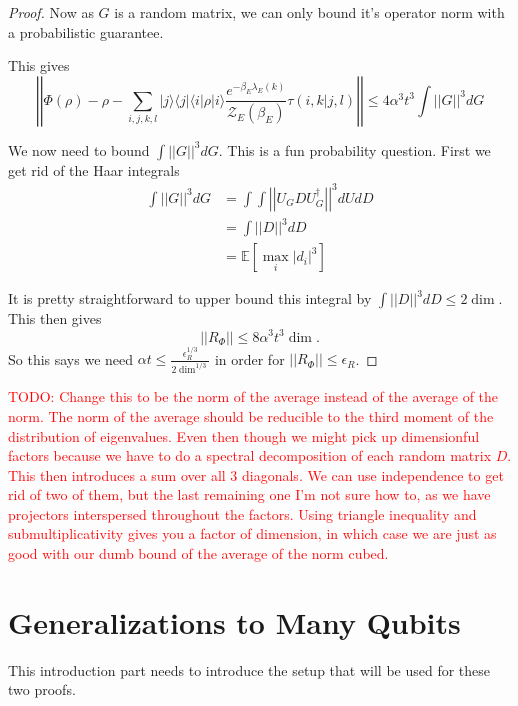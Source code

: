 \documentclass{article}
\newcommand{\ket}[1]{|#1\rangle}
\newcommand{\bra}[1]{\langle #1|}
\newcommand{\ketbra}[2]{| #1\rangle\! \langle #2|}
\newcommand{\brackets}[1]{\left[ #1 \right]}
\newcommand{\norm}[1]{\left| \left| #1 \right| \right|}
\newcommand{\expect}[1]{\mathbb{E}\brackets{#1}}
\newcommand{\partfun}{\mathcal{Z}}
\begin{document}
\begin{proof}
Now as $G$ is a random matrix, we can only bound it's operator norm with a probabilistic guarantee. 

This gives
\begin{equation}
    \norm{\Phi(\rho) - \rho - \sum_{i,j,k,l} \ketbra{j}{j} \bra{i} \rho \ket{i} \frac{e^{-\beta_E \lambda_E(k)}}{\partfun_E(\beta_E)} \tau(i,k | j, l) } \leq 4 \alpha^3 t^3 \int \norm{G}^3 dG
\end{equation}

We now need to bound $\int \norm{G}^3 dG$. This is a fun probability question. First we get rid of the Haar integrals
\begin{align}
    \int \norm{G}^3 dG &= \int \int \norm{U_G D U_G^\dagger}^3  dU dD \\
    &= \int \norm{D}^3 dD \\
    &= \expect{\max_i |d_i|^3}
\end{align}

It is pretty straightforward to upper bound this integral by $\int \norm{D}^3 dD \leq 2 \dim$. This then gives
\begin{equation}
    \norm{R_{\Phi}} \leq 8 \alpha^3 t^3 \dim.
\end{equation}
So this says we need $\alpha t \leq \frac{\epsilon_{R}^{1/3}}{2 \dim^{1/3}}$ in order for $\norm{R_{\Phi}} \leq \epsilon_R$.
\end{proof}

\textcolor{red}{TODO: Change this to be the norm of the average instead of the average of the norm. The norm of the average should be reducible to the third moment of the distribution of eigenvalues. Even then though we might pick up dimensionful factors because we have to do a spectral decomposition of each random matrix $D$. This then introduces a sum over all 3 diagonals. We can use independence to get rid of two of them, but the last remaining one I'm not sure how to, as we have projectors interspersed throughout the factors. Using triangle inequality and submultiplicativity gives you a factor of dimension, in which case we are just as good with our dumb bound of the average of the norm cubed.}

\section{Generalizations to Many Qubits}

This introduction part needs to introduce the setup that will be used for these two proofs.
\end{document}
